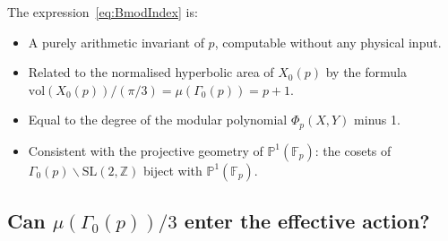 \documentclass[12pt,a4paper]{article}
\theoremstyle{definition}
\theoremstyle{remark}
\begin{document}
The expression~\eqref{eq:BmodIndex} is:
\begin{itemize}
  \item A purely arithmetic invariant of $p$, computable without any physical input.
  \item Related to the normalised hyperbolic area of $X_0(p)$ by the formula
        $\mathrm{vol}(X_0(p))/(\pi/3) = \mu(\Gamma_0(p)) = p+1$.
  \item Equal to the degree of the modular polynomial $\Phi_p(X, Y)$ minus 1.
  \item Consistent with the projective geometry of $\mathbb{P}^1(\mathbb{F}_p)$:
        the cosets of $\Gamma_0(p) \backslash \mathrm{SL}(2,\mathbb{Z})$ biject with
        $\mathbb{P}^1(\mathbb{F}_p)$.
\end{itemize}

\subsection{Can $\mu(\Gamma_0(p))/3$ enter the effective action?}
\end{document}
